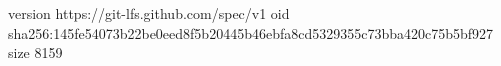 version https://git-lfs.github.com/spec/v1
oid sha256:145fe54073b22be0eed8f5b20445b46ebfa8cd5329355c73bba420c75b5bf927
size 8159
